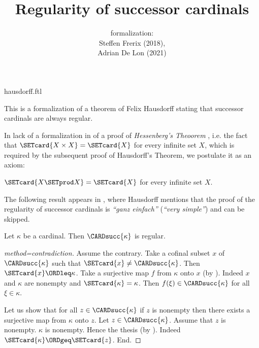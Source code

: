 \documentclass{article}
\title{Regularity of successor cardinals}
\author{\Naproche formalization:\\[0.5em]
Steffen Frerix (2018), \\
Adrian De Lon (2021)}
\date{}
\begin{document}
\begin{smodule}{hausdorff.ftl}
\maketitle


\noindent This is a formalization of a theorem of Felix Hausdorff stating that
successor cardinals are always regular.

In lack of a formalization in \Naproche of a proof of \emph{Hessenberg's
Theoorem} \cite{Hessenberg1906}, i.e. the fact that
$\SETcard{X \times X} = \SETcard{X}$ for every
infinite set $X$, which is required by the subsequent
proof of Hausdorff's Theorem, we postulate it as an axiom:

\begin{axiom*}[forthel,title=Hessenberg's Theorem,id=hessenberg]
  $\SETcard{X \SETprod X} = \SETcard{X}$ for every infinite set $X$.
\end{axiom*}

The following result appears in \cite[p.~443]{Hausdorff1908},
where Hausdorff mentions that the proof of the regularity of successor
cardinals is \textit{``ganz einfach''} (\textit{``very simple''})
and can be skipped.

\begin{forthel}
  \begin{theorem*}[title=Hausdorff]
    Let $\kappa$ be a cardinal.
    Then $\CARDsucc{\kappa}$ is regular.
  \end{theorem*}
  \begin{proof}[method=contradiction]
    Assume the contrary.
    Take a cofinal subset $x$ of $\CARDsucc{\kappa}$ such that $\SETcard{x} \neq \CARDsucc{\kappa}$.
    Then $\SETcard{x} \ORDleq \kappa$.
    Take a surjective map $f$ from $\kappa$ onto $x$ (by ).
    Indeed $x$ and $\kappa$ are nonempty and $\SETcard{\kappa} = \kappa$.
    Then $f(\xi) \in \CARDsucc{\kappa}$ for all $\xi \in \kappa$.

    Let us show that for all $z \in \CARDsucc{\kappa}$ if $z$ is nonempty then there exists a surjective map from $\kappa$ onto $z$.
      Let $z \in \CARDsucc{\kappa}$.
      Assume that $z$ is nonempty.
      $\kappa$ is nonempty.
      Hence the thesis (by ).
      Indeed $\SETcard{\kappa} \ORDgeq \SETcard{z}$.
    End.


\end{proof}
\end{forthel}
\end{smodule}
\end{document}
